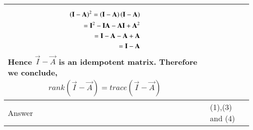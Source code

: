 \documentclass[journal,12pt,twocolumn]{IEEEtran}
\begin{document}
\begin{table}[htbp]
\begin{tabular}{|m{2.0in}|m{5.0in}|}
\begin{align}
	\left(\mathbf{I}-\mathbf{A}\right)^2 = \left(\mathbf{I}-\mathbf{A}\right)\left(\mathbf{I}-\mathbf{A}\right)\\
	= \mathbf{I}^2-\mathbf{IA}-\mathbf{AI}+\mathbf{A}^2 \\
	= \mathbf{I}-\mathbf{A}-\mathbf{A}+\mathbf{A} \\
	= \mathbf{I}-\mathbf{A}
\end{align}
Hence $\vec{I}-\vec{A}$ is an idempotent matrix. Therefore we conclude,
\begin{align}
        rank(\vec{I}-\vec{A})=trace(\vec{I}-\vec{A})
\end{align} \\ \hline
		Answer& (1),(3) and (4) \\ \hline
        \end{tabular}
        \caption{} \label{1}
\end{table}
\end{document}
